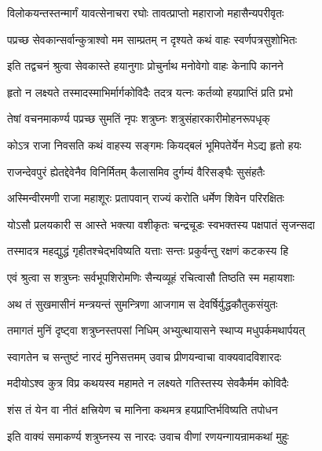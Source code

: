 \twolineshloka
{विलोकयन्तस्तन्मार्गं यावत्सेनाचरा रघोः}
{तावत्प्राप्तो महाराजो महासैन्यपरीवृतः}%

\twolineshloka
{पप्रच्छ सेवकान्सर्वान्कुत्राश्वो मम साम्प्रतम्}
{न दृश्यते कथं वाहः स्वर्णपत्रसुशोभितः}%

\twolineshloka
{इति तद्वचनं श्रुत्वा सेवकास्ते हयानुगाः}
{प्रोचुर्नाथ मनोवेगो वाहः केनापि कानने}%

\twolineshloka
{हृतो न लक्ष्यते तस्मादस्माभिर्मार्गकोविदैः}
{तदत्र यत्नः कर्तव्यो हयप्राप्तिं प्रति प्रभो}%

\twolineshloka
{तेषां वचनमाकर्ण्य पप्रच्छ सुमतिं नृपः}
{शत्रुघ्नः शत्रुसंहारकारीमोहनरूपधृक्}%


\twolineshloka
{कोऽत्र राजा निवसति कथं वाहस्य सङ्गमः}
{कियद्बलं भूमिपतेर्येन मेऽद्य हृतो हयः}%


\twolineshloka
{राजन्देवपुरं ह्येतद्देवेनैव विनिर्मितम्}
{कैलासमिव दुर्गम्यं वैरिसङ्घैः सुसंहतैः}%

\twolineshloka
{अस्मिन्वीरमणी राजा महाशूरः प्रतापवान्}
{राज्यं करोति धर्मेण शिवेन परिरक्षितः}%

\twolineshloka
{योऽसौ प्रलयकारी स आस्ते भक्त्या वशीकृतः}
{चन्द्रचूडः स्वभक्तस्य पक्षपातं सृजन्सदा}%

\twolineshloka
{तस्मादत्र महद्युद्धं गृहीतश्चेद्भविष्यति}
{यत्ताः सन्तः प्रकुर्वन्तु रक्षणं कटकस्य हि}%

\twolineshloka
{एवं श्रुत्वा स शत्रुघ्नः सर्वभूपशिरोमणिः}
{सैन्यव्यूहं रचित्वासौ तिष्ठति स्म महायशाः}%

\twolineshloka
{अथ तं सुखमासीनं मन्त्रयन्तं सुमन्त्रिणा}
{आजगाम स देवर्षिर्युद्धकौतुकसंयुतः}%

\twolineshloka
{तमागतं मुनिं दृष्ट्वा शत्रुघ्नस्तपसां निधिम्}
{अभ्युत्थायासने स्थाप्य मधुपर्कमथार्पयत्}%

\twolineshloka
{स्वागतेन च सन्तुष्टं नारदं मुनिसत्तमम्}
{उवाच प्रीणयन्वाचा वाक्यवादविशारदः}%


\twolineshloka
{मदीयोऽश्व कुत्र विप्र कथयस्व महामते}
{न लक्ष्यते गतिस्तस्य सेवकैर्मम कोविदैः}%

\twolineshloka
{शंस तं येन वा नीतं क्षत्त्रियेण च मानिना}
{कथमत्र हयप्राप्तिर्भविष्यति तपोधन}%

\twolineshloka
{इति वाक्यं समाकर्ण्य शत्रुघ्नस्य स नारदः}
{उवाच वीणां रणयन्गायन्रामकथां मुहुः}%

